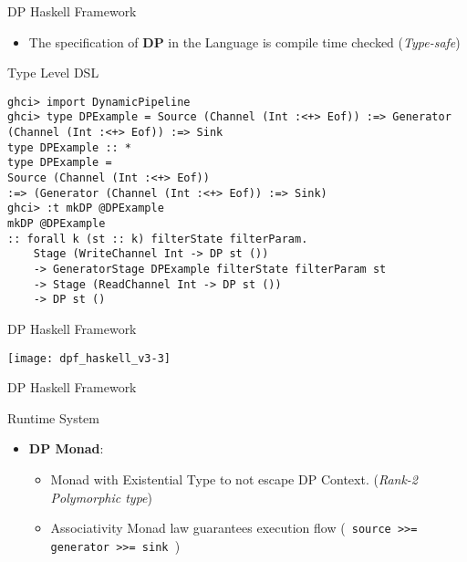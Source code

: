 \begin{frame}[fragile]{DP Haskell Framework}
  \begin{itemize}
    \item The specification of \textbf{DP} in the Language is compile time checked (\textit{Type-safe})
  \end{itemize}    
  \begin{exampleblock}{Type Level DSL}
    \begin{verbatim}      
ghci> import DynamicPipeline
ghci> type DPExample = Source (Channel (Int :<+> Eof)) :=> Generator (Channel (Int :<+> Eof)) :=> Sink
type DPExample :: *
type DPExample =
Source (Channel (Int :<+> Eof))
:=> (Generator (Channel (Int :<+> Eof)) :=> Sink)
ghci> :t mkDP @DPExample
mkDP @DPExample
:: forall k (st :: k) filterState filterParam.
    Stage (WriteChannel Int -> DP st ())
    -> GeneratorStage DPExample filterState filterParam st
    -> Stage (ReadChannel Int -> DP st ())
    -> DP st ()    
  \end{verbatim}
  \end{exampleblock}
\end{frame}

\begin{frame}[fragile]{DP Haskell Framework}
  \begin{center}
    \texttt{[image: dpf\_haskell\_v3-3]}
  \end{center}
\end{frame}

\begin{frame}[fragile]{DP Haskell Framework}
  \begin{block}{Runtime System}
    \begin{itemize}
      \item \textbf{DP Monad}:
      \begin{itemize} 
      \item Monad with Existential Type to not escape DP Context. (\textit{Rank-2 Polymorphic type})
      \item Associativity Monad law guarantees execution flow (\texttt{ source >>= generator >>= sink }) 
      \end{itemize}
    \end{itemize}
  \end{block}
  \end{frame}

